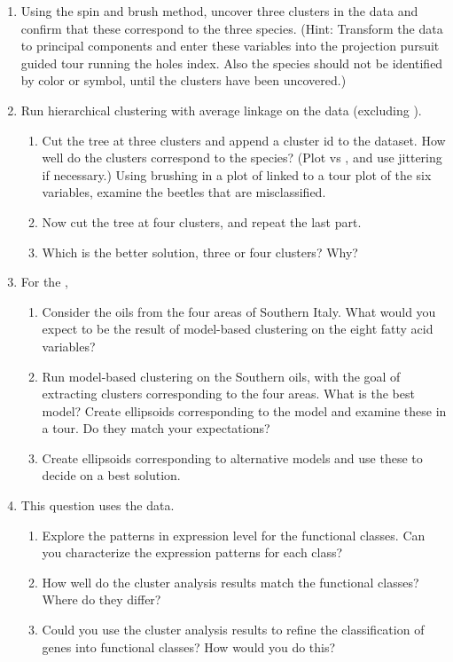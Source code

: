 \begin{enumerate}

\item Using the spin and brush method, uncover three clusters in the
 data and confirm that these correspond to the
three species. (Hint: Transform the data to principal components and
enter these variables into the projection pursuit guided tour running
the holes index. Also the species should not be identified by color or
symbol, until the clusters have been uncovered.)

\item Run hierarchical clustering with average linkage on the
 data (excluding ).

\begin{enumerate}
\item Cut the tree at three clusters and append a cluster id to the dataset. 
How well do the clusters correspond to the species? (Plot
 vs , and use jittering if necessary.)
Using brushing in a plot of  linked to a tour plot of
the six variables, examine the beetles that are misclassified.

\item Now cut the tree at four clusters, and repeat the last part.

\item Which is the better solution, three or four clusters? Why?
\end{enumerate}

\item For the ,
\begin{enumerate}
\item Consider the oils from the four areas of Southern Italy. What
would you expect to be the result of model-based clustering on the
eight fatty acid variables?
\item Run model-based clustering on the Southern oils, with the goal
of extracting clusters corresponding to the four areas. What is the
best model? Create ellipsoids corresponding to the model and examine
these in a tour. Do they match your expectations?
\item Create ellipsoids corresponding to alternative models and use
these to decide on a best solution.
\end{enumerate}

\item This question uses the  data.
\begin{enumerate}
\item Explore the patterns in expression level for the functional
classes. Can you characterize the expression patterns for each class?
\item How well do the cluster analysis results match the functional
classes? Where do they differ? 
\item Could you use the cluster analysis results to refine the
classification of genes into functional classes? How would you do
this?
\end{enumerate}


\end{enumerate}
